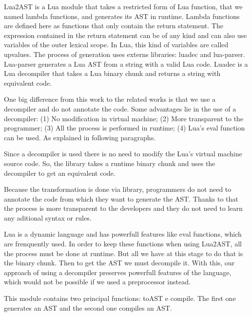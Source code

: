\documentclass[english]{llncs}
\begin{document}
Lua2AST is a Lua module that takes a restricted form of Lua function, that we named lambda functions, and generates its AST in runtime.
Lambda functions are defined here as functions that only contain the return statement.
The expression contained in the return statement can be of any kind and can also use variables of the outer lexical scope.
In Lua, this kind of variables are called upvalues.
The process of generation uses externs libraries: luadec and lua-parser.
Lua-parser\cite{TODO} generates a Lua AST from a string with a valid Lua code.
Luadec\cite{TODO} is a Lua decompiler that takes a Lua binary chunk and returns a string with equivalent code.

One big difference from this work to the related works is that we use a decompiler and do not annotate the code.
Some advantages lie in the use of a decompiler: 
(1) No modification in virtual machine; 
(2) More transparent to the programmer; 
(3) All the process is performed in runtime;
(4) Lua's eval function can be used.
As explained in following paragraphs.

Since a decompiler is used there is no need to modify the Lua's virtual machine source code.
So, the library takes a runtime binary chunk and uses the decompiler to get an equivalent code.

Because the transformation is done via library, programmers do not need to annotate the code from which they want to generate the AST.
Thanks to that the process is more transparent to the developers and they do not need to learn any aditional syntax or rules.


Lua is a dynamic language and has powerfull features like eval functions, which  are frenquently used.
In order to keep these functions when using Lua2AST, all the process must be done at runtime.
But all we have at this stage to do that is the binary chunk. 
Then to get the AST we must decompile it.
With this, our approach of using a decompiler preserves powerfull features of the language, which would not be possible if we used a preprocessor instead.


This module contains two principal functions: toAST e compile.
The first one generates an AST and the second one compiles an AST.
\end{document}
